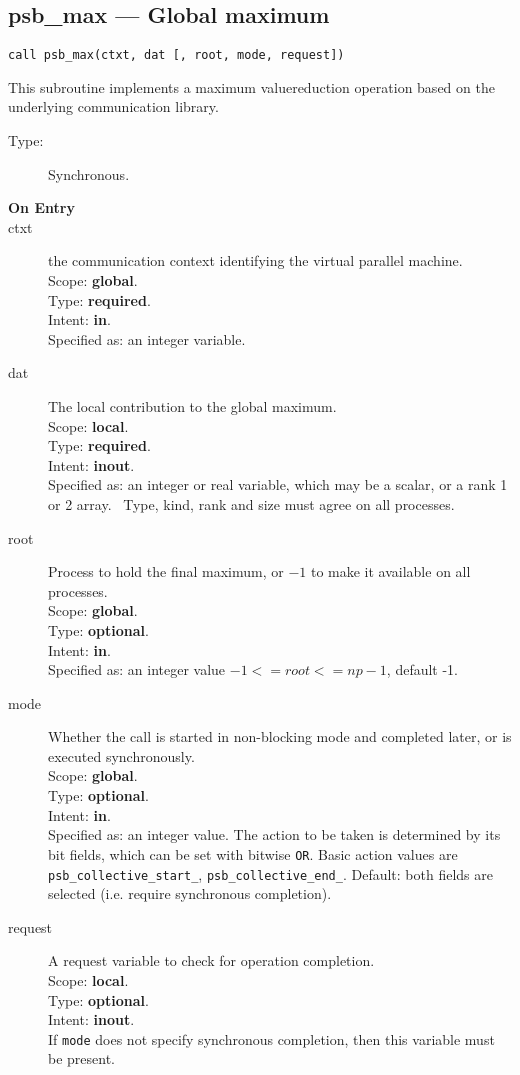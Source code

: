 \clearpage\subsection{psb\_max --- Global maximum}

\begin{verbatim}
call psb_max(ctxt, dat [, root, mode, request])
\end{verbatim}

This subroutine implements a maximum valuereduction
operation based on the underlying communication library. 
\begin{description}
\item[Type:] Synchronous.
\item[\bf  On Entry ]
\item[ctxt] the communication context identifying the virtual
  parallel machine.\\
Scope: {\bf global}.\\
Type: {\bf required}.\\
Intent: {\bf in}.\\
Specified as: an integer variable.
\item[dat] The local contribution to the global maximum.\\
Scope: {\bf local}.\\
Type: {\bf required}.\\
Intent: {\bf inout}.\\
Specified as: an integer or  real variable, which may be a
scalar, or a rank 1 or 2 array. \
Type, kind, rank and size must agree on all processes.
\item[root] Process to hold the final maximum, or $-1$ to make it available
  on all processes.\\
Scope: {\bf global}.\\
Type: {\bf optional}.\\
Intent: {\bf in}.\\
Specified as: an integer value $-1<= root <= np-1$, default -1. \\
\item[mode] Whether the call is started in non-blocking mode and completed
  later, or is executed synchronously.\\
Scope: {\bf global}.\\
Type: {\bf optional}.\\
Intent: {\bf in}.\\
Specified as: an integer value. The action to be taken is determined
by its bit fields, which can be set with bitwise \verb|OR|. Basic
action values are \verb|psb_collective_start_|, \verb|psb_collective_end_|.
Default:  both fields are selected (i.e. require synchronous completion).\\
\item[request] A request variable to check for operation completion.\\
Scope: {\bf local}.\\
Type: {\bf optional}.\\
Intent: {\bf inout}.\\
If \verb|mode| does not specify synchronous completion, then this
variable must be present.
\end{description}


